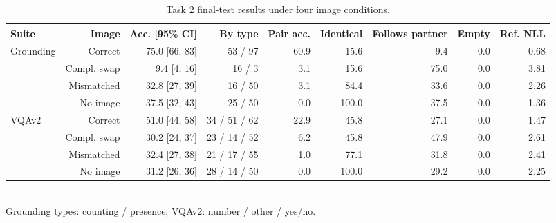 \begin{table}[t]
\centering
\scriptsize
\begin{tabular}{lrrrrrrrr}
\toprule
Suite & Image & Acc. [95\% CI] & By type & Pair acc. & Identical & Follows partner & Empty & Ref. NLL \\
\midrule
Grounding & Correct & 75.0 [66, 83] & 53 / 97 & 60.9 & 15.6 & 9.4 & 0.0 & 0.68 \\
 & Compl. swap & 9.4 [4, 16] & 16 / 3 & 3.1 & 15.6 & 75.0 & 0.0 & 3.81 \\
 & Mismatched & 32.8 [27, 39] & 16 / 50 & 3.1 & 84.4 & 33.6 & 0.0 & 2.26 \\
 & No image & 37.5 [32, 43] & 25 / 50 & 0.0 & 100.0 & 37.5 & 0.0 & 1.36 \\
\midrule
VQAv2 & Correct & 51.0 [44, 58] & 34 / 51 / 62 & 22.9 & 45.8 & 27.1 & 0.0 & 1.47 \\
 & Compl. swap & 30.2 [24, 37] & 23 / 14 / 52 & 6.2 & 45.8 & 47.9 & 0.0 & 2.61 \\
 & Mismatched & 32.4 [27, 38] & 21 / 17 / 55 & 1.0 & 77.1 & 31.8 & 0.0 & 2.41 \\
 & No image & 31.2 [26, 36] & 28 / 14 / 50 & 0.0 & 100.0 & 29.2 & 0.0 & 2.25 \\
\bottomrule
\end{tabular}
\\[2pt]{\footnotesize Grounding types: counting / presence; VQAv2: number / other / yes/no.}
\caption{Task 2 final-test results under four image conditions.}
\label{tab:t2-final}
\end{table}
